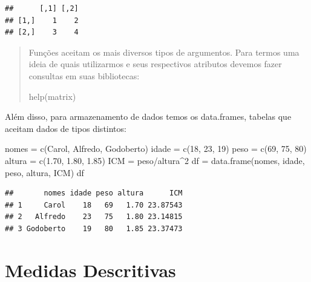 \documentclass[
]{book}
\newenvironment{Shaded}{\begin{snugshade}}{\end{snugshade}}
\newcommand{\DecValTok}[1]{\textcolor[rgb]{0.00,0.00,0.81}{#1}}
\newcommand{\FloatTok}[1]{\textcolor[rgb]{0.00,0.00,0.81}{#1}}
\newcommand{\FunctionTok}[1]{\textcolor[rgb]{0.00,0.00,0.00}{#1}}
\newcommand{\NormalTok}[1]{#1}
\newcommand{\OtherTok}[1]{\textcolor[rgb]{0.56,0.35,0.01}{#1}}
\newcommand{\SpecialCharTok}[1]{\textcolor[rgb]{0.00,0.00,0.00}{#1}}
\newcommand{\StringTok}[1]{\textcolor[rgb]{0.31,0.60,0.02}{#1}}
\begin{document}
\begin{verbatim}
##      [,1] [,2]
## [1,]    1    2
## [2,]    3    4
\end{verbatim}

\begin{quote}
Funções aceitam os mais diversos tipos de argumentos. Para termos uma ideia de quais utilizarmos e seus respectivos atributos devemos fazer consultas em suas bibliotecas:

\begin{Shaded}
\begin{Highlighting}[]
\FunctionTok{help}\NormalTok{(matrix)}
\end{Highlighting}
\end{Shaded}
\end{quote}

Além disso, para armazenamento de dados temos os data.frames, tabelas que aceitam dados de tipos distintos:

\begin{Shaded}
\begin{Highlighting}[]
\NormalTok{nomes }\OtherTok{=} \FunctionTok{c}\NormalTok{(}\StringTok{\textquotesingle{}Carol\textquotesingle{}}\NormalTok{, }\StringTok{\textquotesingle{}Alfredo\textquotesingle{}}\NormalTok{, }\StringTok{\textquotesingle{}Godoberto\textquotesingle{}}\NormalTok{)}
\NormalTok{idade }\OtherTok{=} \FunctionTok{c}\NormalTok{(}\DecValTok{18}\NormalTok{, }\DecValTok{23}\NormalTok{, }\DecValTok{19}\NormalTok{)}
\NormalTok{peso }\OtherTok{=} \FunctionTok{c}\NormalTok{(}\DecValTok{69}\NormalTok{, }\DecValTok{75}\NormalTok{, }\DecValTok{80}\NormalTok{)}
\NormalTok{altura }\OtherTok{=} \FunctionTok{c}\NormalTok{(}\FloatTok{1.70}\NormalTok{, }\FloatTok{1.80}\NormalTok{, }\FloatTok{1.85}\NormalTok{)}
\NormalTok{ICM }\OtherTok{=}\NormalTok{ peso}\SpecialCharTok{/}\NormalTok{altura}\SpecialCharTok{\^{}}\DecValTok{2}
\NormalTok{df }\OtherTok{=} \FunctionTok{data.frame}\NormalTok{(nomes, idade, peso, altura, ICM)}
\NormalTok{df}
\end{Highlighting}
\end{Shaded}

\begin{verbatim}
##       nomes idade peso altura      ICM
## 1     Carol    18   69   1.70 23.87543
## 2   Alfredo    23   75   1.80 23.14815
## 3 Godoberto    19   80   1.85 23.37473
\end{verbatim}

\hypertarget{medidas-descritivas}{%
\chapter{Medidas Descritivas}\label{medidas-descritivas}}
\end{document}
